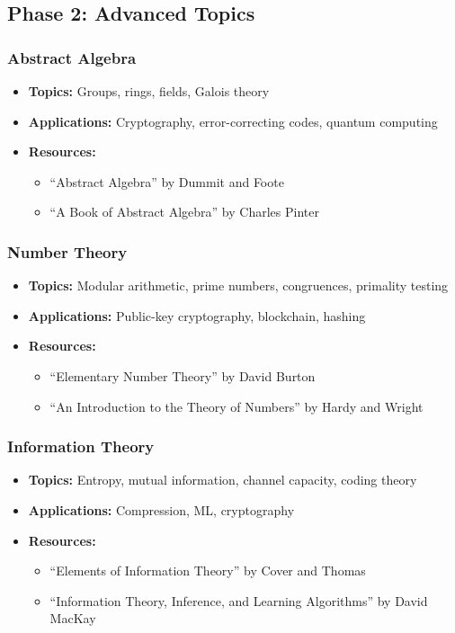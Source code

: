 \documentclass{article}
\begin{document}
\subsection{Phase 2: Advanced Topics}

\subsubsection{Abstract Algebra}
\begin{itemize}[leftmargin=*]
    \item \textbf{Topics:} Groups, rings, fields, Galois theory
    \item \textbf{Applications:} Cryptography, error-correcting codes, quantum computing
    \item \textbf{Resources:}
    \begin{itemize}
        \item ``Abstract Algebra'' by Dummit and Foote
        \item ``A Book of Abstract Algebra'' by Charles Pinter
    \end{itemize}
\end{itemize}

\subsubsection{Number Theory}
\begin{itemize}[leftmargin=*]
    \item \textbf{Topics:} Modular arithmetic, prime numbers, congruences, primality testing
    \item \textbf{Applications:} Public-key cryptography, blockchain, hashing
    \item \textbf{Resources:}
    \begin{itemize}
        \item ``Elementary Number Theory'' by David Burton
        \item ``An Introduction to the Theory of Numbers'' by Hardy and Wright
    \end{itemize}
\end{itemize}

\subsubsection{Information Theory}
\begin{itemize}[leftmargin=*]
    \item \textbf{Topics:} Entropy, mutual information, channel capacity, coding theory
    \item \textbf{Applications:} Compression, ML, cryptography
    \item \textbf{Resources:}
    \begin{itemize}
        \item ``Elements of Information Theory'' by Cover and Thomas
        \item ``Information Theory, Inference, and Learning Algorithms'' by David MacKay
    \end{itemize}
\end{itemize}
\end{document}
